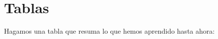 \documentclass{article}
\begin{document}

\section*{Tablas}
Hagamos una tabla que resuma lo que hemos aprendido hasta ahora:
\end{document}
